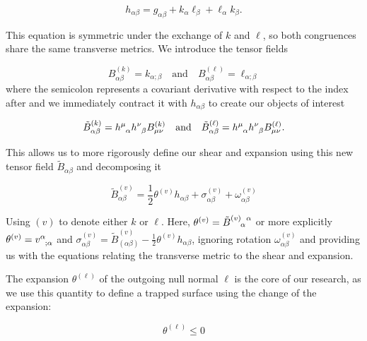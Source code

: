 \documentclass[twoside, openright]{RadboudReport}
\newcommand{\mn}{{\mu\nu}}
\newcommand{\ab}{{\alpha\beta}}
\begin{document}
\begin{equation}
	h_{\alpha\beta} = g_{\alpha\beta} + k_\alpha \ell_\beta + \ell_\alpha k_\beta.
	\label{eq:transversemetric}
\end{equation}

This equation is symmetric under the exchange of $k$ and $\ell$, so both congruences share the same transverse metrics. We introduce the tensor fields

\begin{equation}
	B^{(k)}_{\alpha\beta} = k_{\alpha;\beta}\quad \text{and}\quad B^{(\ell)}_{\alpha\beta} = \ell_{\alpha;\beta}
\end{equation}
where the semicolon represents a covariant derivative with respect to the index after and we immediately contract it with $h_{\alpha\beta}$ to create our objects of interest 

\begin{equation}
	\tilde{B}^{(k)}_{\alpha\beta} = h^\mu_{\hphantom{\mu}\alpha} h^\nu_{\hphantom{\nu}\beta}B^{(k)}_\mn \quad \text{and}\quad \tilde{B}^{(\ell)}_{\alpha\beta} = h^\mu_{\hphantom{\mu}\alpha} h^\nu_{\hphantom{\nu}\beta}B^{(\ell)}_\mn.
\end{equation}

\newpage
This allows us to more rigorously define our shear and expansion using this new tensor field $\tilde{B}_{\alpha\beta}$ and decomposing it

\begin{equation}
	\tilde{B}^{(v)}_\ab = \frac{1}{2}\theta^{(v)} h_\ab + \sigma^{(v)}_\ab + \omega^{(v)}_\ab
\end{equation}

Using $(v)$ to denote either $k$ or $\ell$. Here, $\theta^{(v)} = \tilde{B}^{(v)\hphantom{\alpha}\alpha}_{\hphantom{\alpha}\hphantom{\alpha}\alpha}$ or more explicitly $\theta^{(v)} = v^\alpha_{\hphantom{\alpha};\alpha}$ and $\sigma^{(v)}_\ab = \tilde{B}^{(v)}_{(\ab)} - \frac{1}{2}\theta^{(v)} h_\ab$, ignoring rotation $\omega^{(v)}_\ab$ and providing us with the equations relating the transverse metric to the shear and expansion.\newline

The expansion $\theta^{(\ell)}$ of the outgoing null normal $\ell$ is the core of our research, as we use this quantity to define a trapped surface using the change of the expansion:

\begin{equation}
	\theta^{(\ell)} \leq 0
	\label{eq:trappedsurface}
\end{equation}
\end{document}
